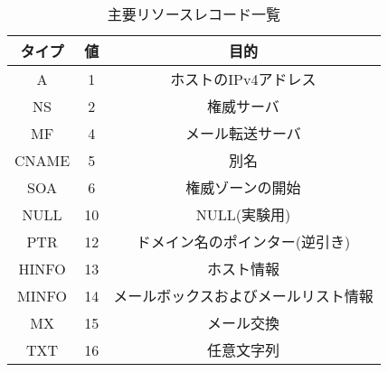 \begin{table}[htb]
 \centering
 \label{tab:resource-record}
 \caption{主要リソースレコード一覧}
  \begin{tabular}{ccc}
	  \toprule
    タイプ & 値 & 目的 \\
    \midrule
    A & 1 &  ホストのIPv4アドレス \\
    NS & 2 & 権威サーバ \\
    MF & 4 & メール転送サーバ \\
    CNAME & 5 & 別名 \\
    SOA & 6 & 権威ゾーンの開始 \\
    NULL & 10 & NULL(実験用) \\
    PTR & 12 & ドメイン名のポインター(逆引き) \\
    HINFO & 13 & ホスト情報 \\
    MINFO & 14 & メールボックスおよびメールリスト情報 \\
    MX & 15 & メール交換 \\
    TXT & 16 & 任意文字列 \\
		\bottomrule
  \end{tabular}
\end{table}
